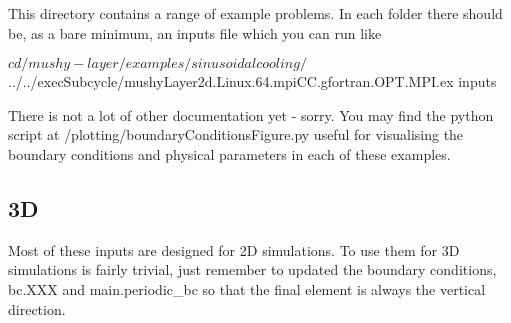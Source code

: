 This directory contains a range of example problems. In each folder there should be, as a bare minimum, an inputs file which you can run like


\begin{DoxyCode}
$ cd /mushy-layer/examples/sinusoidalcooling/
$ ../../execSubcycle/mushyLayer2d.Linux.64.mpiCC.gfortran.OPT.MPI.ex  inputs 
\end{DoxyCode}


There is not a lot of other documentation yet -\/ sorry. You may find the python script at {\ttfamily /plotting/boundary\+Conditions\+Figure.py} useful for visualising the boundary conditions and physical parameters in each of these examples.

\subsection*{3D}

Most of these inputs are designed for 2D simulations. To use them for 3D simulations is fairly trivial, just remember to updated the boundary conditions, {\ttfamily bc.\+X\+XX} and {\ttfamily main.\+periodic\+\_\+bc} so that the final element is always the vertical direction. 